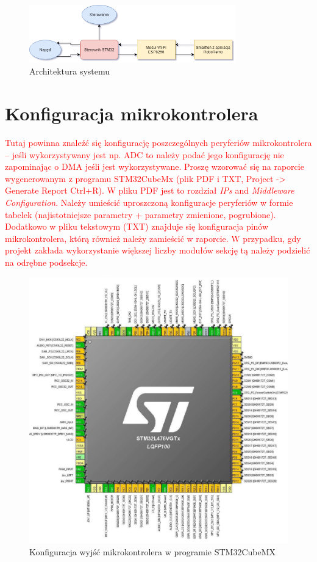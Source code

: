 \documentclass[10pt, a4paper]{article}
\begin{document}
\begin{figure}[H]
	\centering
	\includegraphics[width=0.8\textwidth]{figures/diagram.png}
	\caption{Architektura systemu}
	\label{fig:Architektura}
\end{figure}

\section{Konfiguracja mikrokontrolera}
\textcolor{red}{Tutaj powinna znaleźć się konfigurację poszczególnych peryferiów 
	mikrokontrolera -- jeśli wykorzystywany jest np. ADC to należy 
	podać jego konfigurację nie zapominając o DMA jeśli jest 
	wykorzystywane. Proszę wzorować się na raporcie wygenerowanym 
	z programu STM32CubeMx 
	(plik PDF i TXT, Project -> Generate Report Ctrl+R). 
	W pliku PDF jest to rozdział \textit{IPs} and \textit{Middleware Configuration}. 
	Należy umieścić uproszczoną konfiguracje peryferiów w formie 
	tabelek (najistotniejsze parametry + parametry zmienione, pogrubione).
	Dodatkowo w pliku tekstowym (TXT) znajduje się konfiguracja pinów 
	mikrokontrolera, którą również należy zamieścić w raporcie.
W przypadku, gdy projekt zakłada wykorzystanie większej liczby modułów
sekcję tą należy podzielić na odrębne podsekcje.}

\begin{figure}[H]
	\centering
	\includegraphics[width=1\textwidth]{figures/schemat-1.jpg}
	\caption{Konfiguracja wyjść mikrokontrolera w programie STM32CubeMX}
	\label{fig:KonfiguracjaMikrokontrolera}
\end{figure}
\end{document}
